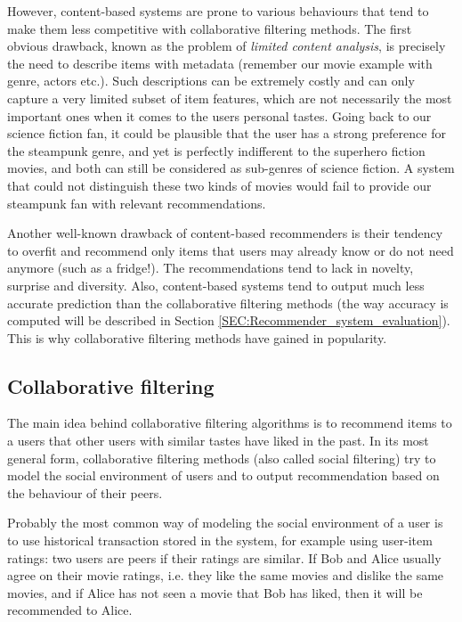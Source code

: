 However, content-based systems are prone to various behaviours that tend to make
them less competitive with collaborative filtering methods. The first obvious drawback, known as
the problem of \textit{limited content analysis}, is precisely the need to
describe items with metadata (remember our movie example with
genre, actors etc.). Such descriptions can be extremely costly and can only
capture a very limited subset of item features, which are not necessarily the
most important ones when it comes to the users personal tastes. Going back to
our science fiction fan, it could be plausible that the user has a strong
preference for the steampunk genre, and yet is perfectly indifferent to the
superhero fiction movies, and both can still be considered as sub-genres of
science fiction. A system that could not distinguish these two kinds of movies
would fail to provide our steampunk fan with relevant recommendations.

Another well-known drawback of content-based recommenders is their tendency to
overfit and recommend only items that users may already know or do not need
anymore (such as a fridge!). The recommendations tend to lack in novelty,
surprise and diversity. Also, content-based systems tend to output much less
accurate prediction than the collaborative filtering methods (the way accuracy
is computed will be described in Section
\ref{SEC:Recommender_system_evaluation}). This is why collaborative filtering
methods have gained in popularity.

\subsection{Collaborative filtering}

The main idea behind collaborative filtering algorithms is to recommend items
to a users that other users with similar tastes have liked in the past. In its
most general form, collaborative filtering methods (also called social
filtering) try to model the social environment of users and to output
recommendation based on the behaviour of their peers.

Probably the most common way of modeling the social environment of a user is to
use historical transaction stored in the system, for example using user-item
ratings: two users are peers if their ratings are similar. If Bob and Alice
usually agree on their movie ratings, i.e. they like the same movies and
dislike the same movies, and if Alice has not seen a movie that Bob has liked,
then it will be recommended to Alice.

